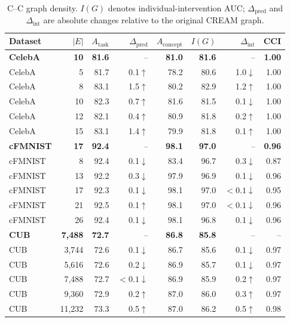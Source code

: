 \begin{table}[t]
\centering
\caption{C--C graph density. $I(G)$ denotes individual-intervention AUC; $\Delta_{\mathrm{pred}}$ and $\Delta_{\mathrm{int}}$ are absolute changes relative to the original CREAM graph.}
\label{tab:cc_density}
\small
\setlength{\tabcolsep}{6pt}
\begin{tabular}{lrrrrrrr}
\toprule
Dataset & $|E|$ & $A_{\mathrm{task}}$ & $\Delta_{\mathrm{pred}}$ & $A_{\mathrm{concept}}$ & $I(G)$ & $\Delta_{\mathrm{int}}$ & CCI \\
\midrule
\rowcolor{gray!15}
\textbf{CelebA} & \textbf{10} & \textbf{81.6} & -- & \textbf{81.0} & \textbf{81.6} & -- & \textbf{1.00} \\
CelebA & 5 & 81.7 & 0.1$\uparrow$ & 78.2 & 80.6 & 1.0$\downarrow$ & 1.00 \\
CelebA & 8 & 83.1 & 1.5$\uparrow$ & 80.2 & 82.9 & 1.2$\uparrow$ & 1.00 \\
CelebA & 10 & 82.3 & 0.7$\uparrow$ & 81.6 & 81.5 & 0.1$\downarrow$ & 1.00 \\
CelebA & 12 & 82.1 & 0.4$\uparrow$ & 80.9 & 81.8 & 0.2$\uparrow$ & 1.00 \\
CelebA & 15 & 83.1 & 1.4$\uparrow$ & 79.9 & 81.8 & 0.1$\uparrow$ & 1.00 \\
\midrule
\rowcolor{gray!15}
\textbf{cFMNIST} & \textbf{17} & \textbf{92.4} & -- & \textbf{98.1} & \textbf{97.0} & -- & \textbf{0.96} \\
cFMNIST & 8 & 92.4 & 0.1$\downarrow$ & 83.4 & 96.7 & 0.3$\downarrow$ & 0.87 \\
cFMNIST & 13 & 92.2 & 0.3$\downarrow$ & 97.9 & 96.9 & 0.1$\downarrow$ & 0.96 \\
cFMNIST & 17 & 92.3 & 0.1$\downarrow$ & 98.1 & 97.0 & $<0.1\downarrow$ & 0.95 \\
cFMNIST & 21 & 92.5 & 0.1$\uparrow$ & 98.1 & 97.0 & $<0.1\downarrow$ & 0.96 \\
cFMNIST & 26 & 92.4 & 0.1$\downarrow$ & 98.1 & 96.8 & 0.1$\downarrow$ & 0.96 \\
\midrule
\rowcolor{gray!15}
\textbf{CUB} & \textbf{7,488} & \textbf{72.7} & -- & \textbf{86.8} & \textbf{85.8} & -- & -- \\
CUB & 3,744 & 72.6 & 0.1$\downarrow$ & 86.7 & 85.6 & 0.1$\downarrow$ & 0.97 \\
CUB & 5,616 & 72.6 & 0.2$\downarrow$ & 86.9 & 85.7 & 0.1$\downarrow$ & 0.97 \\
CUB & 7,488 & 72.7 & $<0.1\downarrow$ & 86.9 & 85.9 & 0.2$\uparrow$ & 0.97 \\
CUB & 9,360 & 72.9 & 0.2$\uparrow$ & 87.0 & 86.0 & 0.3$\uparrow$ & 0.97 \\
CUB & 11,232 & 73.3 & 0.5$\uparrow$ & 87.0 & 86.2 & 0.5$\uparrow$ & 0.98 \\
\bottomrule
\end{tabular}
\end{table}
